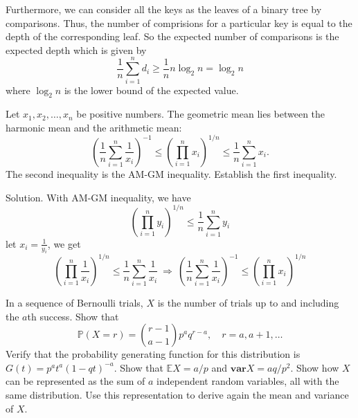 Furthermore, we can consider all the keys as the leaves of a binary tree by comparisons. Thus, the number of comprisions for a particular key is equal to the depth of the corresponding leaf. So the expected number of comparisons is the expected depth which is given by 
\begin{equation}
\frac{1}{n}\sum^n_{i=1}d_i \geq \frac{1}{n}n\log_2 n = \log_2n
\end{equation}
where $\log_2n$ is the lower bound of the expected value.

\vspace{2mm}



\item Let $x_1,x_2,\dots,x_n$ be positive numbers. The geometric mean lies between the harmonic mean and the arithmetic mean:
\begin{equation}
\left(\frac{1}{n}\sum^n_{i=1}\frac{1}{x_i}\right)^{-1}\leq \left(\prod^n_{i=1}x_i\right)^{1/n}\leq \frac{1}{n}\sum^n_{i=1}x_i.
\end{equation}
The second inequality is the AM-GM inequality. Establish the first inequality.

Solution. With AM-GM inequality, we have 
\begin{equation}
\left(\prod^n_{i=1}y_i\right)^{1/n}\leq \frac{1}{n}\sum^n_{i=1}y_i
\end{equation}
let $x_i=\frac{1}{y_i}$, we get
\begin{equation}
\left(\prod^n_{i=1}\frac{1}{x_i}\right)^{1/n}\leq \frac{1}{n}\sum^n_{i=1}\frac{1}{x_i} \ \Rightarrow \ \left(\frac{1}{n}\sum^n_{i=1}\frac{1}{x_i}\right)^{-1}\leq \left(\prod^n_{i=1}x_i\right)^{1/n}
\end{equation}




\item In a sequence of Bernoulli trials, $X$ is the number of trials up to and including the $a$th success. Show that
\begin{equation}
\mathbb{P}\left(X=r\right) = \binom{r-1}{a-1}p^aq^{r-a}, \quad r=a,a+1,\dots
\end{equation}
Verify that the probability generating function for this distribution is $G(t)=p^at^a(1-qt)^{-a}$. Show that $\mathbb{E}X=a/p$ and $\mathbf{var}X=aq/p^2$. Show how $X$ can be represented as the sum of $a$ independent random variables, all with the same distribution. Use this representation to derive again the mean and variance of $X$.
 


